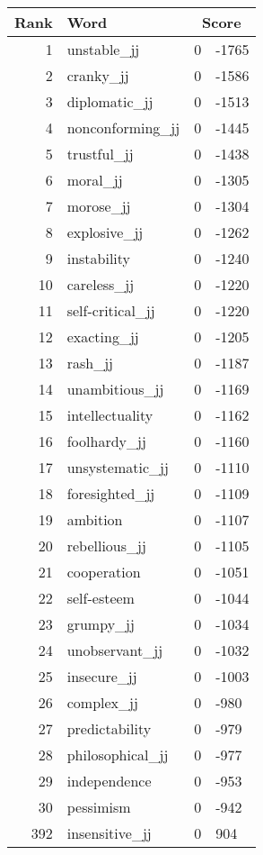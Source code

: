 \begin{longtable}[!htbp]{| rlr@{.}l |}
    \hline
    \textbf{Rank} & \textbf{Word} & \multicolumn{2}{c|}{\textbf{Score}} \\
    \hline
    \endhead
    1 & unstable\_jj & 0 & -1765 \\
    2 & cranky\_jj & 0 & -1586 \\
    3 & diplomatic\_jj & 0 & -1513 \\
    4 & nonconforming\_jj & 0 & -1445 \\
    5 & trustful\_jj & 0 & -1438 \\
    6 & moral\_jj & 0 & -1305 \\
    7 & morose\_jj & 0 & -1304 \\
    8 & explosive\_jj & 0 & -1262 \\
    9 & instability & 0 & -1240 \\
    10 & careless\_jj & 0 & -1220 \\
    11 & self-critical\_jj & 0 & -1220 \\
    12 & exacting\_jj & 0 & -1205 \\
    13 & rash\_jj & 0 & -1187 \\
    14 & unambitious\_jj & 0 & -1169 \\
    15 & intellectuality & 0 & -1162 \\
    16 & foolhardy\_jj & 0 & -1160 \\
    17 & unsystematic\_jj & 0 & -1110 \\
    18 & foresighted\_jj & 0 & -1109 \\
    19 & ambition & 0 & -1107 \\
    20 & rebellious\_jj & 0 & -1105 \\
    21 & cooperation & 0 & -1051 \\
    22 & self-esteem & 0 & -1044 \\
    23 & grumpy\_jj & 0 & -1034 \\
    24 & unobservant\_jj & 0 & -1032 \\
    25 & insecure\_jj & 0 & -1003 \\
    26 & complex\_jj & 0 & -980 \\
    27 & predictability & 0 & -979 \\
    28 & philosophical\_jj & 0 & -977 \\
    29 & independence & 0 & -953 \\
    30 & pessimism & 0 & -942 \\
    392 & insensitive\_jj & 0 & 904 \\

\end{longtable}
